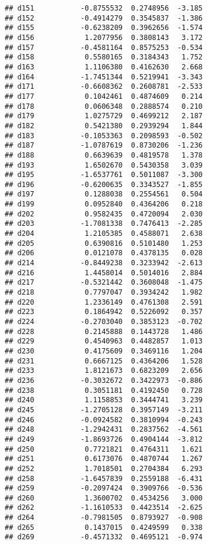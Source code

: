 \documentclass[
]{article}
\begin{document}
\begin{verbatim}
## d151           -0.8755532  0.2748956  -3.185
## d152           -0.4914279  0.3545837  -1.386
## d155           -0.6238209  0.3962656  -1.574
## d156            1.2077956  0.3808143   3.172
## d157           -0.4581164  0.8575253  -0.534
## d158            0.5580165  0.3184343   1.752
## d163            1.1106380  0.4162630   2.668
## d164           -1.7451344  0.5219941  -3.343
## d171           -0.6608362  0.2608781  -2.533
## d177            0.1042461  0.4874609   0.214
## d178            0.0606348  0.2888574   0.210
## d179            1.0275729  0.4699212   2.187
## d182            0.5421380  0.2939294   1.844
## d183           -0.1053363  0.2098593  -0.502
## d187           -1.0787619  0.8730206  -1.236
## d188            0.6639639  0.4819578   1.378
## d193            1.6502670  0.5430358   3.039
## d195           -1.6537761  0.5011087  -3.300
## d196           -0.6200635  0.3343527  -1.855
## d197            0.1288038  0.2554561   0.504
## d199            0.0952840  0.4364206   0.218
## d202            0.9582435  0.4720094   2.030
## d203           -1.7081338  0.7476413  -2.285
## d204            1.2105385  0.4588071   2.638
## d205            0.6390816  0.5101480   1.253
## d206            0.0121078  0.4378135   0.028
## d214           -0.8449238  0.3233942  -2.613
## d216            1.4458014  0.5014016   2.884
## d217           -0.5321442  0.3608048  -1.475
## d218            0.7797047  0.3934242   1.982
## d220            1.2336149  0.4761308   2.591
## d223            0.1864942  0.5226092   0.357
## d224           -0.2703040  0.3853123  -0.702
## d228            0.2145888  0.1443728   1.486
## d229            0.4540963  0.4482857   1.013
## d230            0.4175609  0.3469116   1.204
## d231            0.6667125  0.4364206   1.528
## d233            1.8121673  0.6823209   2.656
## d236           -0.3032672  0.3422973  -0.886
## d238            0.3051181  0.4192450   0.728
## d240            1.1158853  0.3444741   3.239
## d245           -1.2705128  0.3957149  -3.211
## d246           -0.0924582  0.3810994  -0.243
## d248           -1.2942431  0.2837562  -4.561
## d249           -1.8693726  0.4904144  -3.812
## d250            0.7721821  0.4764311   1.621
## d251            0.6173076  0.4870744   1.267
## d252            1.7018501  0.2704384   6.293
## d258           -1.6457839  0.2559188  -6.431
## d259           -0.2097424  0.3909766  -0.536
## d260            1.3600702  0.4534256   3.000
## d262           -1.1610533  0.4423514  -2.625
## d264           -0.7981505  0.8793927  -0.908
## d265            0.1437015  0.4249599   0.338
## d269           -0.4571332  0.4695121  -0.974

\end{verbatim}
\end{document}
